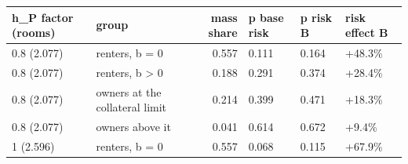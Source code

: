 \begingroup\small
\setlength{\tabcolsep}{3pt}
\renewcommand{\arraystretch}{1.04}
\begin{tabularx}{\linewidth}{XXrXXX}
\toprule
h\_P factor (rooms) & group & mass share & p base risk & p risk B & risk effect B \\
\midrule
0.8 (2.077) & renters, b = 0 & 0.557 & 0.111 & 0.164 & +48.3\% \\
0.8 (2.077) & renters, b \textgreater{} 0 & 0.188 & 0.291 & 0.374 & +28.4\% \\
0.8 (2.077) & owners at the collateral limit & 0.214 & 0.399 & 0.471 & +18.3\% \\
0.8 (2.077) & owners above it & 0.041 & 0.614 & 0.672 & +9.4\% \\
1 (2.596) & renters, b = 0 & 0.557 & 0.068 & 0.115 & +67.9\% \\
\bottomrule
\end{tabularx}
\endgroup

